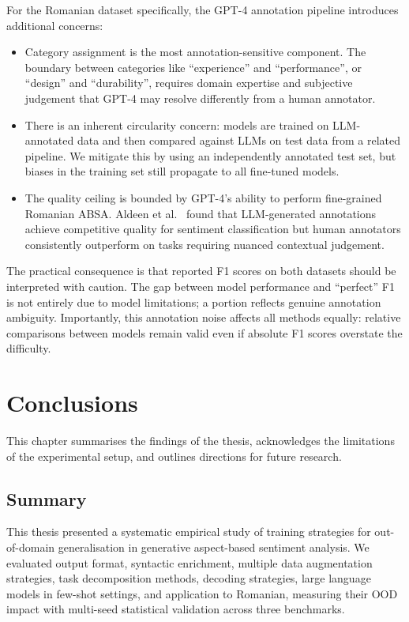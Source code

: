 \documentclass[12pt,a4paper]{report}
\begin{document}
For the Romanian dataset specifically, the GPT-4 annotation pipeline introduces additional concerns:
\begin{itemize}
    \item Category assignment is the most annotation-sensitive component. The boundary between categories like ``experience'' and ``performance'', or ``design'' and ``durability'', requires domain expertise and subjective judgement that GPT-4 may resolve differently from a human annotator.
    \item There is an inherent circularity concern: models are trained on LLM-annotated data and then compared against LLMs on test data from a related pipeline. We mitigate this by using an independently annotated test set, but biases in the training set still propagate to all fine-tuned models.
    \item The quality ceiling is bounded by GPT-4's ability to perform fine-grained Romanian ABSA. Aldeen et al.~\cite{aldeen2023chatgpt} found that LLM-generated annotations achieve competitive quality for sentiment classification but human annotators consistently outperform on tasks requiring nuanced contextual judgement.
\end{itemize}

The practical consequence is that reported F1 scores on both datasets should be interpreted with caution. The gap between model performance and ``perfect'' F1 is not entirely due to model limitations; a portion reflects genuine annotation ambiguity. Importantly, this annotation noise affects all methods equally: relative comparisons between models remain valid even if absolute F1 scores overstate the difficulty.



\chapter{Conclusions}\label{ch:conclusions}

This chapter summarises the findings of the thesis, acknowledges the limitations of the experimental setup, and outlines directions for future research.

\section{Summary}

This thesis presented a systematic empirical study of training strategies for out-of-domain generalisation in generative aspect-based sentiment analysis. We evaluated output format, syntactic enrichment, multiple data augmentation strategies, task decomposition methods, decoding strategies, large language models in few-shot settings, and application to Romanian, measuring their OOD impact with multi-seed statistical validation across three benchmarks.
\end{document}
